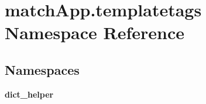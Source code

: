 \section{match\+App.\+templatetags Namespace Reference}
\label{namespacematch_app_1_1templatetags}
\subsection*{Namespaces}
\begin{DoxyCompactItemize}
\item 
 {\bf dict\+\_\+helper}
\end{DoxyCompactItemize}
